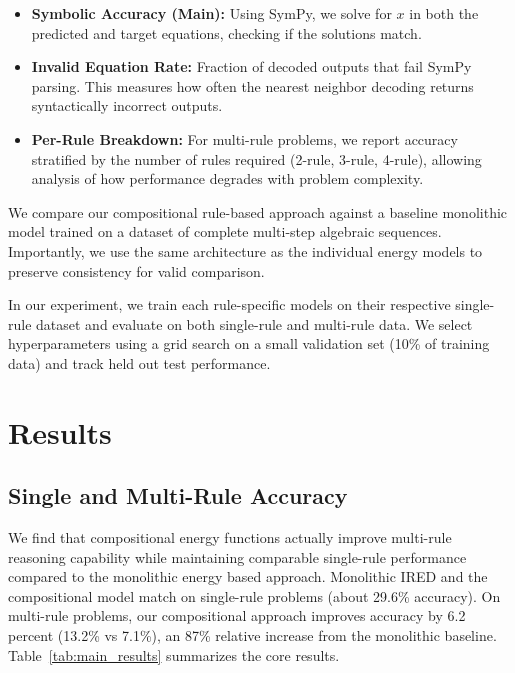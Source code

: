 \documentclass{article}
\begin{document}
\begin{itemize}
\item \textbf{Symbolic Accuracy (Main):} Using SymPy, we solve for $x$ in both the predicted and target equations, checking if the solutions match.


\item \textbf{Invalid Equation Rate:} Fraction of decoded outputs that fail SymPy parsing. This measures how often the nearest neighbor decoding returns syntactically incorrect outputs.

\item \textbf{Per-Rule Breakdown:} For multi-rule problems, we report accuracy stratified by the number of rules required (2-rule, 3-rule, 4-rule), allowing analysis of how performance degrades with problem complexity.
\end{itemize}

We compare our compositional rule-based approach against a baseline monolithic model trained on a dataset of complete multi-step algebraic sequences. Importantly, we use the same architecture as the individual energy models to preserve consistency for valid comparison.

In our experiment, we train each rule-specific models on their respective single-rule dataset and evaluate on both single-rule and multi-rule data. We select hyperparameters using a grid search on a small validation set (10\% of training data) and track held out test performance. 



\section{Results}
\subsection{Single and Multi-Rule Accuracy}
We find that compositional energy functions actually improve multi-rule reasoning capability while maintaining comparable single-rule performance compared to the monolithic energy based approach. Monolithic IRED and the compositional model match on single-rule problems (about 29.6\% accuracy). On multi-rule problems, our compositional approach improves accuracy by 6.2 percent (13.2\% vs 7.1\%), an 87\% relative increase from the monolithic baseline. Table~\ref{tab:main_results} summarizes the core results.
\end{document}
